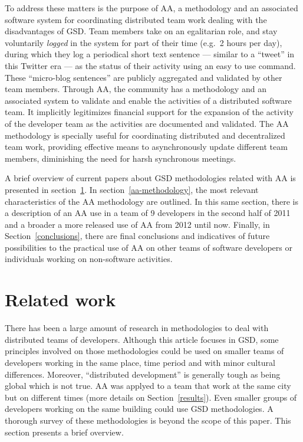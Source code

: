 \documentclass[letterpaper]{article}
\newcommand{\indraftnote}[1]{\textcolor{blue}{\texttt{\footnotesize[#1]}}}
\newcommand{\todo}[1]{\indraftnote{todo: #1}}
\begin{document}
To address these matters is the purpose of AA, a methodology and an associated
software system for coordinating distributed team work dealing with the
disadvantages of GSD. Team members take on an egalitarian role, and stay
voluntarily \textit{logged} in the system for part of their time (e.g.\ 2 hours
per day), during which they log a periodical short text sentence --- similar to
a ``tweet'' in this Twitter era --- as the status of their activity using an
easy to use command. These ``micro-blog sentences'' are publicly aggregated and
validated by other team members. Through AA, the community has a methodology and
an associated system to validate and enable the activities of a distributed
software team. It implicitly legitimizes financial support for the expansion of
the activity of the developer team as the activities are documented and
validated.  The AA methodology is specially useful for coordinating distributed
and decentralized team work, providing effective means to asynchronously update
different team members, diminishing the need for harsh synchronous meetings.


A brief overview of current papers about GSD methodologies related with AA is
presented in section~\ref{related-work}. In section~\ref{aa-methodology}, the
most relevant characteristics of the AA methodology are outlined. In this same
section, there is a description of an AA use in a team of 9 developers in the
second half of 2011 and a broader a more released use of AA from 2012 until
now. Finally, in Section~\ref{conclusions}, there are final conclusions and
indicatives of future possibilities to the practical use of AA on other teams of
software developers or individuals working on non-software activities.

\section{Related work}
\label{related-work}



There has been a large amount of research in methodologies to
deal with distributed teams of developers. Although this article focuses in GSD,
some principles involved on those methodologies could be used on smaller teams
of developers working in the same place, time period and with minor cultural
differences. Moreover, ``distributed development'' is generally tough as being
global which is not true. AA was applyed to a team that work at the
same city but on different times (more details on Section~\ref{results}). Even
smaller groups of developers working on the same building could use GSD
methodologies. A thorough survey of these methodologies is beyond the scope of
this paper. This section presents a brief overview.
\end{document}
